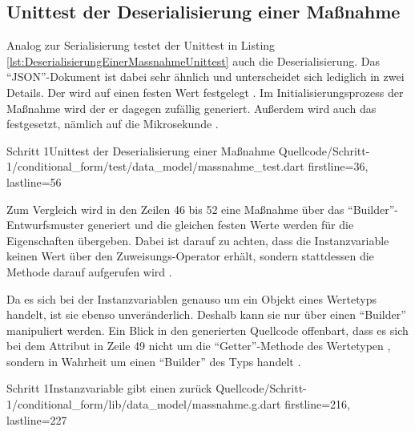 
\ifodd\value{page}\hbox{}\newpage\fi
\subsection{Unittest der Deserialisierung einer Maßnahme}

Analog zur Serialisierung testet der Unittest in Listing \ref{lst:DeserialisierungEinerMassnahmeUnittest} auch die Deserialisierung.
Das \enquote{JSON}-Dokument ist dabei sehr ähnlich und unterscheidet sich lediglich in zwei Details.
Der  wird auf einen festen Wert festgelegt .
Im Initialisierungsprozess der Maßnahme wird der er dagegen zufällig generiert.
Außerdem wird auch das  festgesetzt, nämlich auf die Mikrosekunde  .

\begin{alexlisting}{Schritt 1}{Unittest der Deserialisierung einer Maßnahme}
  {Quellcode/Schritt-1/conditional_form/test/data_model/massnahme_test.dart}
  {firstline=36, lastline=56}
  \label{lst:DeserialisierungEinerMassnahmeUnittest}
\end{alexlisting}


Zum Vergleich wird in den Zeilen 46 bis 52 eine Maßnahme über das \enquote{Builder}-Entwurfsmuster generiert
und die gleichen festen Werte werden für die Eigenschaften übergeben.
Dabei ist darauf zu achten, dass die Instanzvariable  keinen Wert über den Zuweisungs-Operator \IC{=} erhält,
sondern stattdessen die Methode  darauf aufgerufen wird .

Da es sich bei der Instanzvariablen  genauso um ein Objekt eines Wertetyps handelt, ist sie ebenso unveränderlich.
Deshalb kann sie nur über einen \enquote{Builder} manipuliert werden.
Ein Blick in den generierten Quellcode offenbart,
dass es sich bei dem Attribut  in Zeile 49 nicht um die \enquote{Getter}-Methode des Wertetypen ,
sondern in Wahrheit um einen \enquote{Builder} des Typs
 handelt
.

\begin{alexlisting}{Schritt 1}{Instanzvariable  gibt einen  zurück}
  {Quellcode/Schritt-1/conditional_form/lib/data_model/massnahme.g.dart}
  {firstline=216, lastline=227}
  \label{lst:Schritt1InstanzvariableLetzteBearbeitungGibtEinenLetzteBearbeitungBuilderZurueck}
\end{alexlisting}


